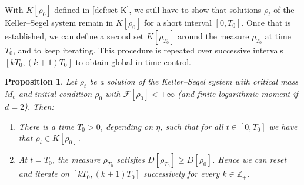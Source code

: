\documentclass[11pt,a4paper]{article}
\numberwithin{equation}{section}
\newcommand{\R}{{\mathbb{R}}}
\theoremstyle{plain}
\newtheorem{proposition}[theorem]{Proposition}
\theoremstyle{remark}
\newcommand{\diff}{\mathop{}\!\mathrm{d}}
\begin{document}
With $K[\rho_0]$ defined in \eqref{def:set K}, we still have to show that solutions $\rho_t$ of the Keller--Segel system remain in $K[\rho_0]$ for a short interval $[0,T_0]$. Once that is established, we can define a second set $K[\rho_{T_0}]$ around the measure $\rho_{T_0}$ at time $T_0$, and to keep iterating. This procedure is repeated over successive intervals $[kT_0,(k+1)T_0]$ to obtain global-in-time control.


\begin{proposition}\label{prop:short_time_stay_in_K}
Let $\rho_t$ be a solution of the Keller--Segel system with critical mass $M_c$ and initial condition $\rho_0$ with $\mathcal F[\rho_0]<+\infty$ (and finite logarithmic moment if $d=2$).  Then:
\begin{enumerate}
\item There is a time $T_0>0$, depending on $\eta$, such that for all $t\in[0,T_0]$ we have that $\rho_t \in K[\rho_0]$.
\item At $t=T_0$, the measure $\rho_{T_0}$ satisfies $D[\rho_{T_0}]\geq D[\rho_0]$. 
Hence we can reset and iterate on $[k T_0,(k+1) T_0]$ successively for every $k \in \mathbb{Z}_+$.
\end{enumerate}
\end{proposition}
\end{document}
